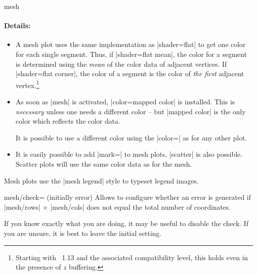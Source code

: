 {\begin{plottype}[/pgfplots]{mesh}
	\paragraph{Details:}
	\begin{itemize}
		\item 
	A mesh plot uses the same implementation as |shader=flat| to get one color for each single segment. Thus, if |shader=flat mean|, the color for a segment is determined using the \emph{mean} of the color data of adjacent vertices. If |shader=flat corner|, the color of a segment is the color of \emph{the first} adjacent vertex.\footnote{Starting with \PGFPlots\ 1.13 and the associated compatibility level, this holds even in the presence of $z$ buffering.}
		\item As soon as |mesh| is activated, |color=mapped color| is installed. This is \emph{necessary} unless one needs a different color -- but |mapped color| is the only color which reflects the color data.

		It is possible to use a different color using the |color=| as for any other plot.

		\item It is easily possible to add |mark=| to mesh plots, |scatter| is also possible. Scatter plots will use the same color data as for the mesh.
	\end{itemize}

\pgfplotsexpensiveexample
\begin{codeexample}[]
\end{codeexample}
	
	Mesh plots use the |mesh legend| style to typeset legend images.
\end{plottype}

\begin{pgfplotskey}{mesh/check= (initially error)}
	Allows to configure whether an error is generated if |mesh/rows| $\times$ |mesh/cols| does not equal the total number of coordinates.

	If you know exactly what you are doing, it may be useful to disable the check. If you are unsure, it is best to leave the initial setting.
\end{pgfplotskey}

}
